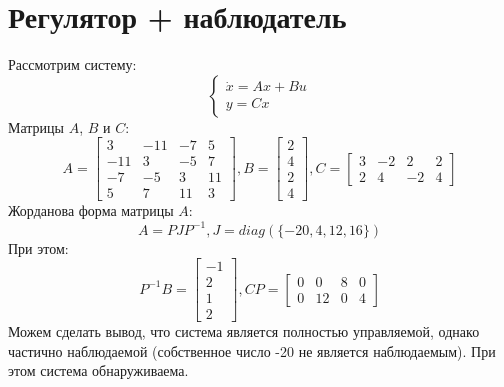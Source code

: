 \section{Регулятор + наблюдатель}
Рассмотрим систему:
\begin{equation}
    \begin{cases}
        \dot x = Ax + Bu \\
        y = Cx
    \end{cases}
\end{equation}
Матрицы $A$, $B$ и $C$:
\begin{equation*}
    A = \begin{bmatrix}
        3 & -11 & -7 & 5 \\
        -11 & 3 & -5 & 7 \\
        -7 & -5 & 3 & 11 \\
        5 & 7 & 11 & 3
    \end{bmatrix},
    B = \begin{bmatrix}
        2 \\ 4 \\ 2 \\ 4
    \end{bmatrix},
    C = \begin{bmatrix}
        3 & -2 & 2 & 2 \\
        2 & 4 & -2 & 4
    \end{bmatrix}
\end{equation*}
Жорданова форма матрицы $A$:
\begin{equation*}
    A = PJP^{-1}, J = diag(\{-20,4,12,16\})
\end{equation*}
При этом:
\begin{equation*}
    P^{-1}B = \begin{bmatrix}
        -1\\2\\1\\2
    \end{bmatrix},
    CP= \begin{bmatrix}
        0 & 0 & 8 & 0 \\
        0 & 12 & 0 & 4
    \end{bmatrix}
\end{equation*}
Можем сделать вывод, что система является полностью управляемой, однако частично наблюдаемой 
(собственное число -20 не является наблюдаемым). При этом система обнаруживаема.

